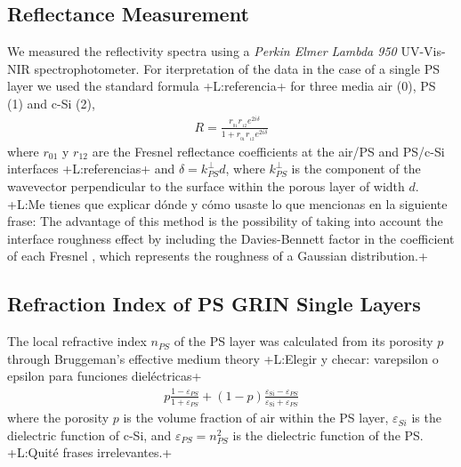 \documentclass{article}
\newcommand{\notaL}[1]{{\color{blue}+L:#1+}}
\begin{document}
\subsection{Reflectance Measurement}
We measured the reflectivity spectra using a {\em Perkin Elmer Lambda 950}
UV-Vis-NIR spectrophotometer. For iterpretation of the data in the
case of a single PS layer we used
the standard formula \notaL{referencia} for three media air (0), PS
(1) and c-Si (2),
 \begin{eqnarray}\label{Eq:ECMR}
   R=\frac{r _ {_ {01}}r _ {_ {12}} e^{2i\delta}}{1+r _ {_ {01}}r _ {_ {12}} e^{2i\delta}}
\end{eqnarray}
where $ r_{01} $ y $ r_{12}$ are the Fresnel reflectance
coefficients at the air/PS and PS/c-Si interfaces \notaL{referencias}
and $\delta=k_{PS}^\perp d$, where $k_{PS}^\perp$ is
the component of the wavevector perpendicular to the surface within
the porous layer of width $d$.
\notaL{Me tienes que explicar dónde y cómo usaste lo que mencionas en
  la siguiente frase:
The advantage of this method is
the possibility of taking into account the interface roughness effect
by including the Davies-Bennett factor in the coefficient of each
Fresnel \cite{I17, I18, I19}, which represents the roughness of a
Gaussian distribution.}
\subsection{Refraction Index of PS GRIN Single Layers}
The local refractive index $n_{PS}$ of the PS layer was calculated from its
porosity $p$ through
Bruggeman's effective medium theory \cite{I20} \notaL{Elegir y checar:
  varepsilon o epsilon para funciones dieléctricas}
\begin{eqnarray}\label{Eq:Brugg}
 p\frac{1-\varepsilon_{PS}} {1+\varepsilon_{PS}} + (1-p)
  \frac{\varepsilon_{\text{Si}} - \varepsilon_{PS}}
  {\varepsilon_{\text{Si}}+\varepsilon_{PS}}
\end{eqnarray}
where the porosity $p$ is the volume fraction of air within the PS
layer, $\varepsilon_{Si}$ is the dielectric function of c-Si, and
$\varepsilon_{PS}=n_{PS}^2$ is the dielectric function of the PS.
\notaL{Quité frases irrelevantes.}
\end{document}
